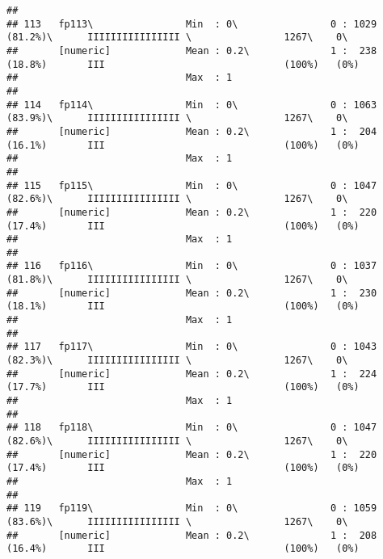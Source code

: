 \documentclass[]{article}
\begin{document}
\begin{verbatim}
## 
## 113   fp113\                Min  : 0\                0 : 1029 (81.2%)\      IIIIIIIIIIIIIIII \                1267\    0\       
##       [numeric]             Mean : 0.2\              1 :  238 (18.8%)       III                               (100%)   (0%)     
##                             Max  : 1                                                                                            
## 
## 114   fp114\                Min  : 0\                0 : 1063 (83.9%)\      IIIIIIIIIIIIIIII \                1267\    0\       
##       [numeric]             Mean : 0.2\              1 :  204 (16.1%)       III                               (100%)   (0%)     
##                             Max  : 1                                                                                            
## 
## 115   fp115\                Min  : 0\                0 : 1047 (82.6%)\      IIIIIIIIIIIIIIII \                1267\    0\       
##       [numeric]             Mean : 0.2\              1 :  220 (17.4%)       III                               (100%)   (0%)     
##                             Max  : 1                                                                                            
## 
## 116   fp116\                Min  : 0\                0 : 1037 (81.8%)\      IIIIIIIIIIIIIIII \                1267\    0\       
##       [numeric]             Mean : 0.2\              1 :  230 (18.1%)       III                               (100%)   (0%)     
##                             Max  : 1                                                                                            
## 
## 117   fp117\                Min  : 0\                0 : 1043 (82.3%)\      IIIIIIIIIIIIIIII \                1267\    0\       
##       [numeric]             Mean : 0.2\              1 :  224 (17.7%)       III                               (100%)   (0%)     
##                             Max  : 1                                                                                            
## 
## 118   fp118\                Min  : 0\                0 : 1047 (82.6%)\      IIIIIIIIIIIIIIII \                1267\    0\       
##       [numeric]             Mean : 0.2\              1 :  220 (17.4%)       III                               (100%)   (0%)     
##                             Max  : 1                                                                                            
## 
## 119   fp119\                Min  : 0\                0 : 1059 (83.6%)\      IIIIIIIIIIIIIIII \                1267\    0\       
##       [numeric]             Mean : 0.2\              1 :  208 (16.4%)       III                               (100%)   (0%)     

\end{verbatim}
\end{document}
